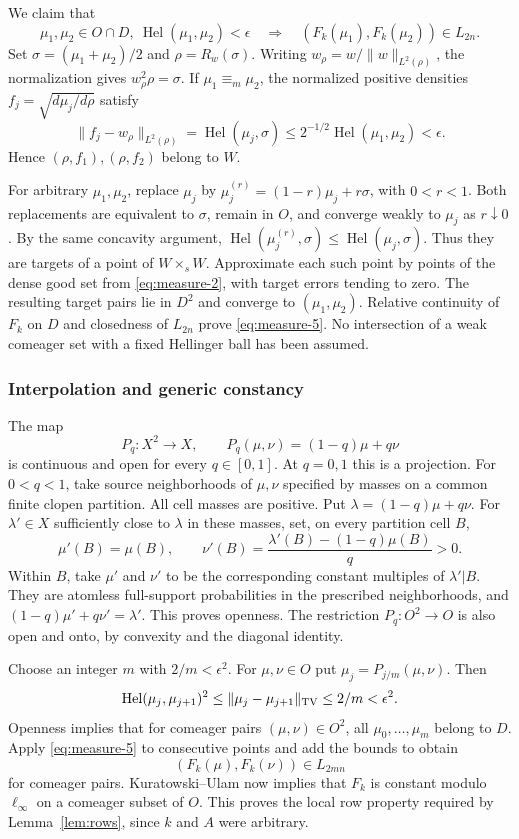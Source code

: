 \documentclass[11pt]{article}
\numberwithin{equation}{section}
\theoremstyle{definition}
\newcommand{\meq}{\equiv_m}
\newcommand{\Hel}{\operatorname{Hel}}
\begin{document}
We claim that
\begin{equation}\label{eq:measure-5}
\mu_1,\mu_2\in O\cap D,\ \Hel(\mu_1,\mu_2)<\epsilon
 \quad\Longrightarrow\quad
       (F_k(\mu_1),F_k(\mu_2))\in L_{2n}.
\end{equation}
Set $\sigma=(\mu_1+\mu_2)/2$ and $\rho=R_w(\sigma)$.
Writing $w_\rho=w/\|w\|_{L^2(\rho)}$, the normalization gives
$w_\rho^2\rho=\sigma$.
If $\mu_1\meq\mu_2$, the normalized positive densities
$f_j=\sqrt{d\mu_j/d\rho}$ satisfy
\[
 \|f_j-w_\rho\|_{L^2(\rho)}
 =\Hel(\mu_j,\sigma)
 \le 2^{-1/2}\Hel(\mu_1,\mu_2)<\epsilon.
\]
Hence $(\rho,f_1),(\rho,f_2)$ belong to $W$.

For arbitrary $\mu_1,\mu_2$, replace $\mu_j$ by
$\mu_j^{(r)}=(1-r)\mu_j+r\sigma$, with $0<r<1$.
Both replacements are equivalent to $\sigma$, remain in $O$, and
converge weakly to $\mu_j$ as $r\downarrow0$.
By the same concavity argument,
$\Hel(\mu_j^{(r)},\sigma)\le \Hel(\mu_j,\sigma)$.
Thus they are targets of a point of $W\times_s W$.
Approximate each such point by points of the dense good set from \eqref{eq:measure-2},
with target errors tending to zero. The resulting target pairs lie in
$D^2$ and converge to $(\mu_1,\mu_2)$.
Relative continuity of $F_k$ on $D$ and closedness of $L_{2n}$ prove \eqref{eq:measure-5}.
No intersection of a weak comeager set with a fixed Hellinger ball
has been assumed.

\subsubsection{Interpolation and generic constancy}
The map
\[
 P_q:X^2\to X,\qquad P_q(\mu,\nu)=(1-q)\mu+q\nu
\]
is continuous and open for every $q\in[0,1]$.
At $q=0,1$ this is a projection. For $0<q<1$, take source
neighborhoods of $\mu,\nu$ specified by masses on a common finite
clopen partition. All cell masses are positive. Put
$\lambda=(1-q)\mu+q\nu$.
For $\lambda'\in X$ sufficiently close to $\lambda$ in these masses,
set, on every partition cell $B$,
\[
 \mu'(B)=\mu(B),\qquad
 \nu'(B)=\frac{\lambda'(B)-(1-q)\mu(B)}q>0.
\]
Within $B$, take $\mu'$ and $\nu'$ to be the corresponding constant
multiples of $\lambda'|B$. They are atomless full-support probabilities
in the prescribed neighborhoods, and
$(1-q)\mu'+q\nu'=\lambda'$. This proves openness.
The restriction $P_q:O^2\to O$ is also open and onto, by convexity and
the diagonal identity.

Choose an integer $m$ with $2/m<\epsilon^2$.
For $\mu,\nu\in O$ put $\mu_j=P_{j/m}(\mu,\nu)$.
Then
\[
 \Hel(\mu_j,\mu_{j+1})^2
 \le \|\mu_j-\mu_{j+1}\|_{\rm TV}
 \le 2/m<\epsilon^2.
\]
Openness implies that for comeager pairs $(\mu,\nu)\in O^2$, all
$\mu_0,\ldots,\mu_m$ belong to $D$.
Apply \eqref{eq:measure-5} to consecutive points and add the bounds to obtain
\[
 (F_k(\mu),F_k(\nu))\in L_{2mn}
\]
for comeager pairs. Kuratowski--Ulam now implies that $F_k$ is constant
modulo $\ell_\infty$ on a comeager subset of $O$.
This proves the local row property required by Lemma~\ref{lem:rows},
since $k$ and $A$ were arbitrary.
\end{document}
